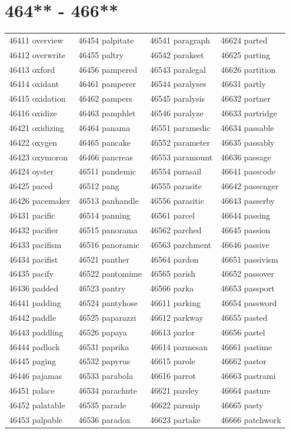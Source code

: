 \documentclass[10pt, oneside]{book}
\begin{document}
\begin{table}
	\centering
	\section*{464** - 466**}
	\begin{tabular}{l l l l}
46411 overview &46454 palpitate &46541 paragraph &46624 parted\\
46412 overwrite &46455 paltry &46542 parakeet &46625 parting\\
46413 oxford &46456 pampered &46543 paralegal &46626 partition\\
46414 oxidant &46461 pamperer &46544 paralyses &46631 partly\\
46415 oxidation &46462 pampers &46545 paralysis &46632 partner\\
46416 oxidize &46463 pamphlet &46546 paralyze &46633 partridge\\
46421 oxidizing &46464 panama &46551 paramedic &46634 passable\\
46422 oxygen &46465 pancake &46552 parameter &46635 passably\\
46423 oxymoron &46466 pancreas &46553 paramount &46636 passage\\
46424 oyster &46511 pandemic &46554 parasail &46641 passcode\\
46425 paced &46512 pang &46555 parasite &46642 passenger\\
46426 pacemaker &46513 panhandle &46556 parasitic &46643 passerby\\
46431 pacific &46514 panning &46561 parcel &46644 passing\\
46432 pacifier &46515 panorama &46562 parched &46645 passion\\
46433 pacifism &46516 panoramic &46563 parchment &46646 passive\\
46434 pacifist &46521 panther &46564 pardon &46651 passivism\\
46435 pacify &46522 pantomime &46565 parish &46652 passover\\
46436 padded &46523 pantry &46566 parka &46653 passport\\
46441 padding &46524 pantyhose &46611 parking &46654 password\\
46442 paddle &46525 paparazzi &46612 parkway &46655 pasted\\
46443 paddling &46526 papaya &46613 parlor &46656 pastel\\
46444 padlock &46531 paprika &46614 parmesan &46661 pastime\\
46445 paging &46532 papyrus &46615 parole &46662 pastor\\
46446 pajamas &46533 parabola &46616 parrot &46663 pastrami\\
46451 palace &46534 parachute &46621 parsley &46664 pasture\\
46452 palatable &46535 parade &46622 parsnip &46665 pasty\\
46453 palpable &46536 paradox &46623 partake &46666 patchwork\\
	\end{tabular}
 \end{table}
\clearpage
\end{document}
